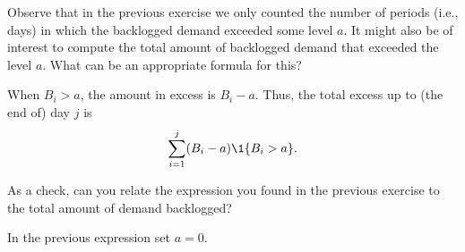 \begin{exercise}
  Observe that in the previous exercise we only counted the number of
  periods (i.e., days) in which the backlogged demand exceeded some level $a$. It
  might also be of interest to compute the total amount of
 backlogged demand that exceeded the level $a$. What can be an appropriate formula for this? 
\begin{solution}
    When $B_i>a$, the amount in excess is $B_i-a$. Thus,  the total excess up to (the end of) day $j$ is
    \begin{equation*}
      \sum_{i=1}^j (B_i-a) \1{B_i > a}.
    \end{equation*}
\end{solution}
\end{exercise}


\begin{exercise}
As a check, can you relate the expression you found in the previous exercise to the total amount of demand backlogged? 
  \begin{solution}
    In the previous expression set $a=0$. 
  \end{solution}
\end{exercise}


\begin{comment}
  
\begin{exercise}[\faRocket]
 If you like, you can try to formulate an optimization problem for
 the problem on how much to produce. \tbd
 \begin{solution}

   TBD = to be done = unfinished. You can always skip exercises that
   are marked as TBD.

The decision variables are whether we switch on the machine at the days, i.e., $c_1, c_2, \ldots, c_j$. 

The constraints are:

\begin{align*}
c_i &\in \{0, 10\}, \\
     S_i &= \min\{B_{i-1}+d_i, c_i\}, \\
 B_i &= B_{i-1}+d_i - S_i.
\end{align*}

In Section 16.2 of Factory Physics it is shown how to optimize this
problem in excel for \emph{given} demand, i.e., if we know the
demands.  If we don't know the demands, then things become quite a bit
different.

\end{solution}
\end{exercise}

\end{comment}


